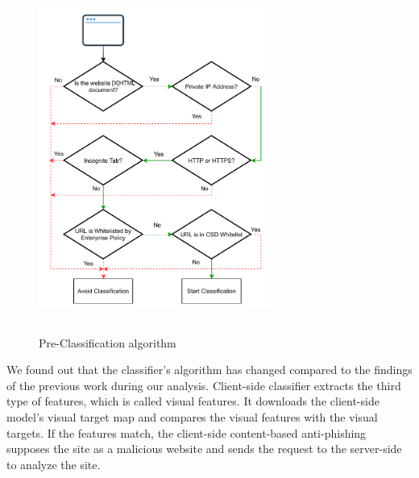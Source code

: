 \documentclass[letterpaper,twocolumn,10pt]{article}
\begin{document}
\begin{enumerate}
\begin{figure}[!h]
\centering
\includegraphics[height=4.5in, width=3in]{preclassificationdiagram-3.pdf}
\caption{Pre-Classification algorithm}
\label{fig:Pre-classification}
\end{figure} 
We found out that the classifier's algorithm has changed compared to the findings of the previous work during our analysis.
Client-side classifier extracts the third type of features, which is called visual features.  It downloads the client-side model's visual target map and compares the visual features with the visual targets. If the features match, the client-side content-based anti-phishing supposes the site as a malicious website and sends the request to the server-side to analyze the site.
\end{enumerate}
\end{document}
